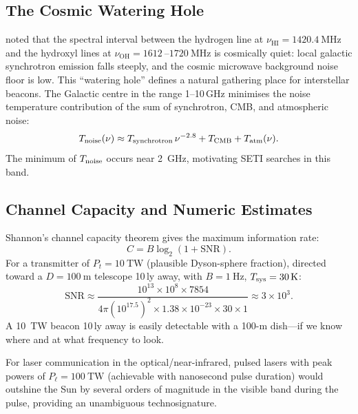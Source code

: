 \documentclass[12pt,a4paper]{article}
\begin{document}
\subsection{The Cosmic Watering Hole}

\citet{Oliver1971} noted that the spectral interval between the hydrogen line
at $\nu_{\mathrm{HI}} = \SI{1420.4}{\mega\hertz}$ and the hydroxyl lines at
$\nu_{\mathrm{OH}} = \SI{1612}{}$--$\SI{1720}{\mega\hertz}$ is cosmically
quiet: local galactic synchrotron emission falls steeply, and the cosmic
microwave background noise floor is low. This ``watering hole'' defines a
natural gathering place for interstellar beacons. The Galactic centre in the
range 1--10\,GHz minimises the noise temperature contribution of the sum of
synchrotron, CMB, and atmospheric noise:
\begin{equation}
  T_{\rm noise}(\nu) \approx T_{\rm synchrotron}\,\nu^{-2.8}
    + T_{\rm CMB} + T_{\rm atm}(\nu).
\end{equation}
The minimum of $T_{\rm noise}$ occurs near \SI{2}{\giga\hertz}, motivating
SETI searches in this band.

\subsection{Channel Capacity and Numeric Estimates}

Shannon's channel capacity theorem \citep{Shannon1948} gives the maximum
information rate:
\begin{equation}
  C = B\log_2\!\left(1 + \mathrm{SNR}\right).
  \label{eq:shannon}
\end{equation}
For a transmitter of $P_t = \SI{10}{\tera\watt}$ (plausible Dyson-sphere
fraction), directed toward a $D = \SI{100}{\meter}$ telescope 10\,ly away,
with $B = \SI{1}{\hertz}$, $T_{\rm sys} = \SI{30}{\kelvin}$:
\begin{equation*}
  \mathrm{SNR} \approx \frac{10^{13} \times 10^8 \times 7854}{4\pi (10^{17.5})^2
    \times 1.38\times 10^{-23} \times 30 \times 1} \approx 3\times 10^{3}.
\end{equation*}
A \SI{10}{\tera\watt} beacon 10\,ly away is easily detectable with a
100-m dish---if we know where and at what frequency to look.

For laser communication in the optical/near-infrared, pulsed lasers with
peak powers of $P_\ell = \SI{100}{\tera\watt}$ (achievable with nanosecond
pulse duration) would outshine the Sun by several orders of magnitude in the
visible band during the pulse, providing an unambiguous technosignature.
\end{document}
